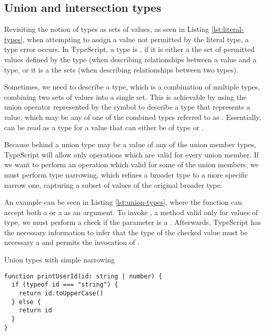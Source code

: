 \subsection{Union and intersection types}

Revisiting the notion of types as sets of values, as seen in Listing \ref{lst:literal-types}, when attempting to assign a value not permitted by the literal type, a type error occurs. In TypeScript, a type is , if it is either a  the set of permitted values defined by the type (when describing relationships between a value and a type, or it is a  the sets (when describing relationships between two types).


Sometimes, we need to describe a type, which is a combination of multiple types, combining two sets of values into a single set. This is achievable by using the union operator represented by the \code{|} symbol to describe a type that represents a value, which may be any of one of the combined types referred to as  \cite{DocumentationEverydayTypes}. Essentially,  can be read as a type for a value that can either be of type  or .

Because behind a union type may be a value of any of the union member types, TypeScript will allow only operations which are valid for every union member. If we want to perform an operation which valid for some of the union members, we must perform type narrowing, which refines a broader type to a more specific narrow one, capturing a subset of values of the original broader type.

An example can be seen in Listing \ref{lst:union-types}, where the function  can accept both a  or a  as an argument. To invoke , a method valid only for values of  type, we must perform a check if the parameter is a . Afterwards, TypeScript has the necessary information to infer that the type of the checked value must be necessary a  and permits the invocation of .

\begin{listing}[ht]
  \caption{Union types with simple narrowing}\label{lst:union-types}
  \begin{verbatim}
function printUserId(id: string | number) {
  if (typeof id === "string") {
    return id.toUpperCase()
  } else {
    return id
  }
}
  \end{verbatim}
\end{listing}

